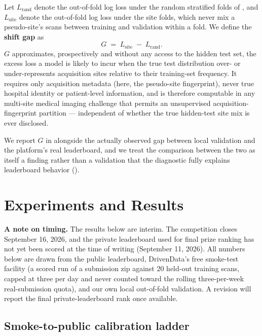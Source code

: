 \documentclass[11pt]{article}
\newcommand{\shiftgap}{\ensuremath{G}}
\newcommand{\lrand}{\ensuremath{L_{\text{rand}}}}
\newcommand{\lsite}{\ensuremath{L_{\text{site}}}}
\begin{document}
Let \lrand{} denote the out-of-fold log loss under the random stratified folds of , and \lsite{} denote the out-of-fold log loss under the site folds, which never mix a pseudo-site's scans between training and validation within a fold. We define the \textbf{shift gap} as
\begin{equation}
\shiftgap \;=\; \lsite \;-\; \lrand.
\label{eq:shiftgap}
\end{equation}
\shiftgap{} approximates, prospectively and without any access to the hidden test set, the excess loss a model is likely to incur when the true test distribution over- or under-represents acquisition sites relative to their training-set frequency. It requires only acquisition metadata (here, the pseudo-site fingerprint), never true hospital identity or patient-level information, and is therefore computable in any multi-site medical imaging challenge that permits an unsupervised acquisition-fingerprint partition --- independent of whether the true hidden-test site mix is ever disclosed.

We report \shiftgap{} in  alongside the actually observed gap between local validation and the platform's real leaderboard, and we treat the comparison between the two as itself a finding rather than a validation that the diagnostic fully explains leaderboard behavior ().

\section{Experiments and Results}
\label{sec:results}

\textbf{A note on timing.} The results below are interim. The competition closes September 16, 2026, and the private leaderboard used for final prize ranking has not yet been scored at the time of writing (September 11, 2026). All numbers below are drawn from the public leaderboard, DrivenData's free smoke-test facility (a scored run of a submission zip against 20 held-out training scans, capped at three per day and never counted toward the rolling three-per-week real-submission quota), and our own local out-of-fold validation. A revision will report the final private-leaderboard rank once available.

\subsection{Smoke-to-public calibration ladder}
\end{document}
